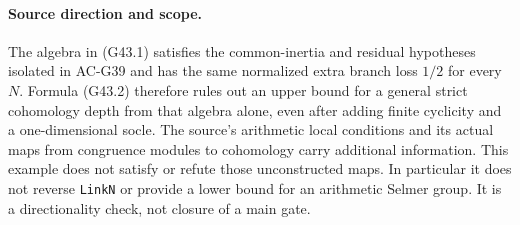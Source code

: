 \paragraph{Source direction and scope.}
The algebra in (G43.1) satisfies the common-inertia
and residual hypotheses isolated in AC-G39 and has
the same normalized extra branch loss $1/2$ for
every $N$.  Formula (G43.2) therefore rules out an
upper bound for a general strict cohomology depth
from that algebra alone, even after adding finite
cyclicity and a one-dimensional socle.  The source's
arithmetic local conditions and its actual maps
from congruence modules to cohomology carry additional
information.  This example does not satisfy or
refute those unconstructed maps.  In particular it
does not reverse \texttt{LinkN} or provide a lower
bound for an arithmetic Selmer group.  It is a
directionality check, not closure of a main gate.
